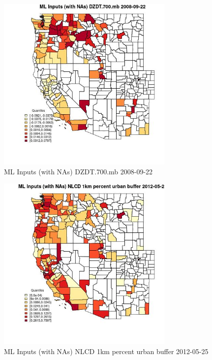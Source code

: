 \begin{figure} 
\centering  
\includegraphics[width=0.77\textwidth]{Code_Outputs/Report_ML_input_PM25_Step4_part_e_de_duplicated_aves_compiled_2019-05-18wNAs_CountyDZDT700mbMean2008-09-22_2008-09-22.jpg} 
\caption{\label{fig:Report_ML_input_PM25_Step4_part_e_de_duplicated_aves_compiled_2019-05-18wNAsCountyDZDT700mbMean2008-09-22_2008-09-22}ML Inputs (with NAs) DZDT.700.mb 2008-09-22} 
\end{figure} 
 

\begin{figure} 
\centering  
\includegraphics[width=0.77\textwidth]{Code_Outputs/Report_ML_input_PM25_Step4_part_e_de_duplicated_aves_compiled_2019-05-18wNAs_CountyNLCD_1km_percent_urban_bufferMean2012-05-25_2012-05-25.jpg} 
\caption{\label{fig:Report_ML_input_PM25_Step4_part_e_de_duplicated_aves_compiled_2019-05-18wNAsCountyNLCD_1km_percent_urban_bufferMean2012-05-25_2012-05-25}ML Inputs (with NAs) NLCD 1km percent urban buffer 2012-05-25} 
\end{figure} 
 

